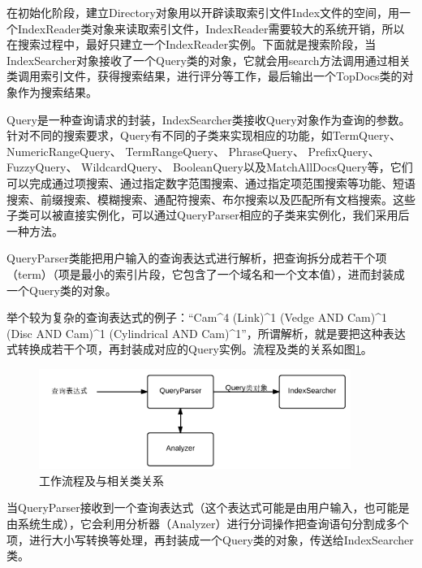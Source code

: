 \documentclass[12pt,a4paper]{article}
\newcommand{\wuhao}{\fontsize{10.5pt}{\baselineskip}\selectfont}
\begin{document}
	在初始化阶段，建立{\Times Directory}对象用以开辟读取索引文件{\Times Index}文件的空间，用一个{\Times IndexReader}类对象来读取索引文件，{\Times IndexReader}需要较大的系统开销，所以在搜索过程中，最好只建立一个{\Times IndexReader}实例。下面就是搜索阶段，当{\Times IndexSearcher}对象接收了一个{\Times Query}类的对象，它就会用{\Times search}方法调用通过相关类调用索引文件，获得搜索结果，进行评分等工作，最后输出一个{\Times TopDocs}类的对象作为搜索结果。	
	\vspace{6pt}
	
	{\Times Query}是一种查询请求的封装，{\Times IndexSearcher}类接收{\Times Query}对象作为查询的参数。针对不同的搜索要求，{\Times Query}有不同的子类来实现相应的功能，如{\Times TermQuery}、 {\Times NumericRangeQuery}、 {\Times TermRangeQuery}、 {\Times PhraseQuery}、 {\Times PrefixQuery}、 {\Times FuzzyQuery}、 {\Times WildcardQuery}、 {\Times BooleanQuery}以及{\Times MatchAllDocsQuery}等，它们可以完成通过项搜索、通过指定数字范围搜索、通过指定项范围搜索等功能、短语搜索、前缀搜索、模糊搜索、通配符搜索、布尔搜索以及匹配所有文档搜索。这些子类可以被直接实例化，可以通过{\Times QueryParser}相应的子类来实例化，我们采用后一种方法。
	\vspace{6pt}
	
	{\Times QueryParser}类能把用户输入的查询表达式进行解析，把查询拆分成若干个项（{\Times term}）（项是最小的索引片段，它包含了一个域名和一个文本值），进而封装成一个{\Times Query}类的对象。
	
	举个较为复杂的查询表达式的例子：“{\Times Cam\^{}4 (Link)\^{}1 (Vedge AND Cam)\^{}1 (Disc AND Cam)\^{}1 (Cylindrical AND Cam)\^{}1}”，所谓解析，就是要把这种表达式转换成若干个项，再封装成对应的{\Times Query}实例。流程及类的关系如图\ref{fig:QueryParser}。
	
	\begin{figure}[htbp] 
	\centering\includegraphics[width=4in]{fig/QueryParser.png} 
	\caption{\wuhao {\Times QueryParser}工作流程及与相关类关系}\label{fig:QueryParser} 
	\end{figure} 
	
	当{\Times QueryParser}接收到一个查询表达式（这个表达式可能是由用户输入，也可能是由系统生成），它会利用分析器（{\Times Analyzer}）进行分词操作把查询语句分割成多个项，进行大小写转换等处理，再封装成一个{\Times Query}类的对象，传送给{\Times IndexSearcher}类。
	
\end{document}
